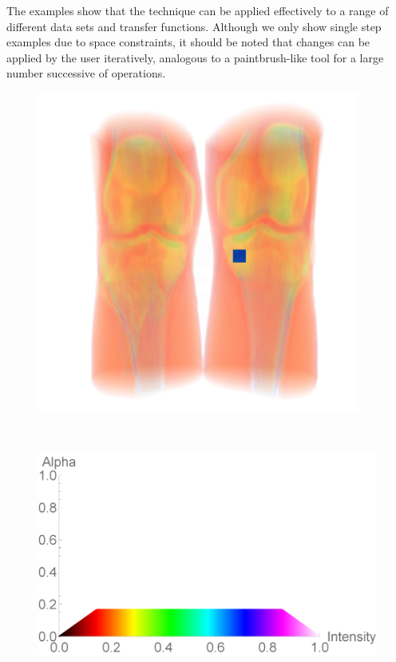 \documentclass[twoside,twocolumn,10pt]{article}
\begin{document}
The examples show that the technique can be applied effectively to a range of different data sets and transfer functions. Although we only show single step examples due to space constraints, it should be noted that changes can be applied by the user iteratively, analogous to a paintbrush-like tool for a large number successive of operations.

\begin{figure}
	\centering
	\begin{minipage}{.1\textwidth}
		\centering
		\includegraphics[width=1\linewidth]{CT-Knee_crop}
		\label{fig:CT-Knee}
	\end{minipage}~
	\begin{minipage}{.12\textwidth}
		\centering
		\includegraphics[width=1\linewidth]{tf_CT-Knee}

\end{minipage}
\end{figure}
\end{document}
